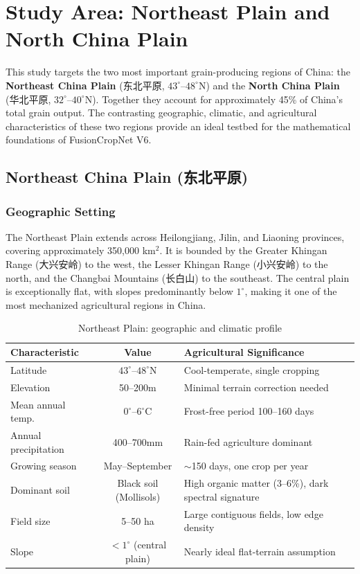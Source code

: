 \section{Study Area: Northeast Plain and North China Plain}

This study targets the two most important grain-producing regions of China:
the \textbf{Northeast China Plain} (东北平原, $43^\circ$--$48^\circ$N) and the
\textbf{North China Plain} (华北平原, $32^\circ$--$40^\circ$N). Together they
account for approximately 45\% of China's total grain output. The contrasting
geographic, climatic, and agricultural characteristics of these two regions
provide an ideal testbed for the mathematical foundations of FusionCropNet V6.

\subsection{Northeast China Plain (东北平原)}

\subsubsection{Geographic Setting}

The Northeast Plain extends across Heilongjiang, Jilin, and Liaoning provinces,
covering approximately 350,000 km$^2$. It is bounded by the Greater Khingan
Range (大兴安岭) to the west, the Lesser Khingan Range (小兴安岭) to the north,
and the Changbai Mountains (长白山) to the southeast. The central plain is
exceptionally flat, with slopes predominantly below $1^\circ$, making it one of
the most mechanized agricultural regions in China.

\begin{table}[h]
\centering
\caption{Northeast Plain: geographic and climatic profile}
\begin{tabular}{lcl}
\toprule
\textbf{Characteristic} & \textbf{Value} & \textbf{Agricultural Significance} \\
\midrule
Latitude & $43^\circ$--$48^\circ$N & Cool-temperate, single cropping \\
Elevation & 50--200m & Minimal terrain correction needed \\
Mean annual temp. & $0^\circ$--$6^\circ$C & Frost-free period 100--160 days \\
Annual precipitation & 400--700mm & Rain-fed agriculture dominant \\
Growing season & May--September & $\sim$150 days, one crop per year \\
Dominant soil & Black soil (Mollisols) & High organic matter (3--6\%), dark spectral signature \\
Field size & 5--50 ha & Large contiguous fields, low edge density \\
Slope & $<1^\circ$ (central plain) & Nearly ideal flat-terrain assumption \\
\bottomrule
\end{tabular}
\end{table}

